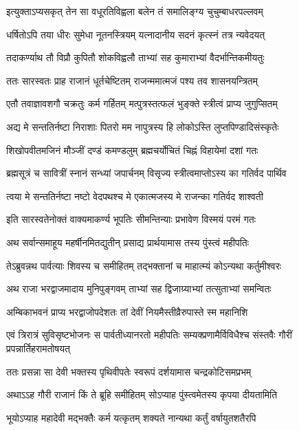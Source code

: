 \twolineshloka
{इत्युक्ताऽप्यसकृत् तेन सा वधूरतिविह्वला}
{बलेन तं समालिङ्ग्य चुचुम्बाधरपल्लवम्} %

\twolineshloka
{धर्षितोऽपि तया धीरः सुमेधा नूतनस्त्रियम्}
{यत्नादानीय सदनं कृत्स्नं तत्र न्यवेदयत्} %

\twolineshloka
{तदाकर्ण्याथ तौ विप्रौ कुपितौ शोकविह्वलौ}
{ताभ्यां सह कुमाराभ्यां वैदर्भान्तिकमीयतुः} %

\twolineshloka
{ततः सारस्वतः प्राह राजानं धूर्तचेष्टितम्}
{राजन्ममात्मजं पश्य तव शासनयन्त्रितम्} %

\twolineshloka
{एतौ तवाज्ञावशगौ चक्रतुः कर्म गर्हितम्}
{मत्पुत्रस्तत्फलं भुङ्क्ते स्त्रीत्वं प्राप्य जुगुप्सितम्} %

\twolineshloka
{अद्य मे सन्ततिर्नष्टा निराशाः पितरो मम}
{नापुत्रस्य हि लोकोऽस्ति लुप्तपिण्डादिसंस्कृतेः} %

\twolineshloka
{शिखोपवीतमजिनं मौञ्जीं दण्डं कमण्डलुम्}
{ब्रह्मचर्योचितं चिह्नं विहायेमां दशां गतः} %

\twolineshloka
{ब्रह्मसूत्रं च सावित्रीं स्नानं सन्ध्यां जपार्चनम्}
{विसृज्य स्त्रीत्वमाप्तोऽस्य का गतिर्वद पार्थिव} %

\twolineshloka
{त्वया मे सन्ततिर्नष्टा नष्टो वेदपथश्च मे}
{एकात्मजस्य मे राजन्का गतिर्वद शाश्वती} %

\twolineshloka
{इति सारस्वतेनोक्तं वाक्यमाकर्ण्य भूपतिः}
{सीमन्तिन्याः प्रभावेण विस्मयं परमं गतः} %

\twolineshloka
{अथ सर्वान्समाहूय महर्षीनमितद्युतीन्}
{प्रसाद्य प्रार्थयामास तस्य पुंस्त्वं महीपतिः} %

\twolineshloka
{तेऽब्रुवन्नथ पार्वत्याः शिवस्य च समीहितम्}
{तद्भक्तानां च माहात्म्यं कोऽन्यथा कर्तुमीश्वरः} %

\twolineshloka
{अथ राजा भरद्वाजमादाय मुनिपुङ्गवम्}
{ताभ्यां सह द्विजाग्र्याभ्यां तत्सुताभ्यां समन्वितः} %

\twolineshloka
{अम्बिकाभवनं प्राप्य भरद्वाजोपदेशतः}
{तां देवीं नियमैस्तीव्रैरुपास्ते स्म महानिशि} %

\fourlineindentedshloka
{एवं त्रिरात्रं सुविसृष्टभोजनः}
{स पार्वतीध्यानरतो महीपतिः}
{सम्यक्प्रणामैर्विविधैश्च संस्तवैः}
{गौरीं प्रपन्नार्तिहरामतोषयत्} %

\twolineshloka
{ततः प्रसन्ना सा देवी भक्तस्य पृथिवीपतेः}
{स्वरूपं दर्शयामास चन्द्रकोटिसमप्रभम्} %

\twolineshloka
{अथाऽऽह गौरी राजानं किं ते ब्रूहि समीहितम्}
{सोऽप्याह पुंस्त्वमेतस्य कृपया दीयतामिति} %

\twolineshloka
{भूयोऽप्याह महादेवी मद्भक्तैः कर्म यत्कृतम्}
{शक्यते नान्यथा कर्तुं वर्षायुतशतैरपि} %

